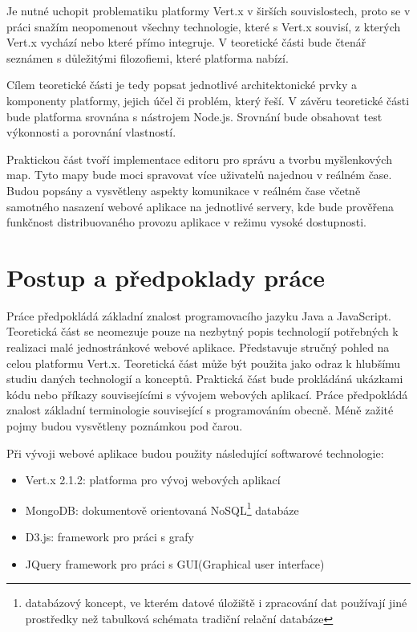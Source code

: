 Je nutné uchopit problematiku platformy Vert.x v širších souvislostech, proto se v práci snažím neopomenout všechny technologie, které s Vert.x souvisí, z kterých Vert.x vychází nebo které přímo integruje. V teoretické části bude čtenář seznámen s důležitými filozofiemi, které platforma nabízí. %

Cílem teoretické části je tedy popsat jednotlivé architektonické prvky a komponenty platformy, jejich účel či problém, který řeší. V závěru teoretické části bude platforma srovnána s nástrojem Node.js. Srovnání bude obsahovat test výkonnosti a porovnání vlastností.

Praktickou část tvoří implementace editoru pro správu a tvorbu myšlenkových map. Tyto mapy bude moci spravovat více uživatelů najednou v reálném čase. Budou popsány a vysvětleny aspekty komunikace v reálném čase včetně samotného nasazení webové aplikace na jednotlivé servery, kde bude prověřena funkčnost distribuovaného provozu aplikace v režimu vysoké dostupnosti.

\section{Postup a předpoklady práce}

Práce předpokládá základní znalost programovacího jazyku Java a JavaScript. Teoretická část se neomezuje pouze na nezbytný popis technologií potřebných k realizaci malé jednostránkové webové aplikace. Představuje stručný pohled na celou platformu Vert.x. Teoretická část může být použita jako odraz k hlubšímu studiu daných technologií a konceptů. Praktická část bude prokládáná ukázkami kódu nebo příkazy souvisejícími s vývojem webových aplikací. Práce předpokládá znalost základní terminologie související s programováním obecně. Méně zažité pojmy budou vysvětleny poznámkou pod čarou.

Při vývoji webové aplikace budou použity následující softwarové technologie:
\begin{itemize}
\item Vert.x 2.1.2: platforma pro vývoj webových aplikací
\item MongoDB: dokumentově orientovaná NoSQL\footnote{databázový koncept, ve kterém datové úložiště i zpracování dat používají jiné prostředky než tabulková schémata tradiční relační databáze} databáze
\item D3.js: framework pro práci s grafy
\item JQuery framework pro práci s GUI(Graphical user interface)
\end{itemize}